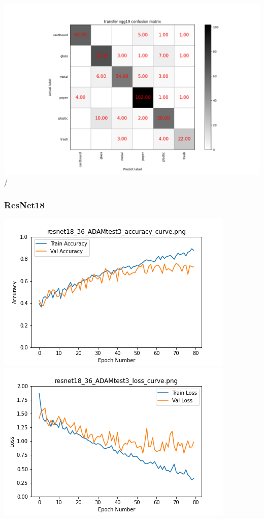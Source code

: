 \documentclass[UTF8]{ctexart}
\begin{document}
\includegraphics[scale=0.5]{cm/vgg19.png} /

\subsubsection{ResNet18}
\includegraphics[scale=0.5]{image/resnet18_36_ADAMtest3_accuracy_curve.png} 
\includegraphics[scale=0.5]{image/resnet18_36_ADAMtest3_loss_curve.png} 
\end{document}
